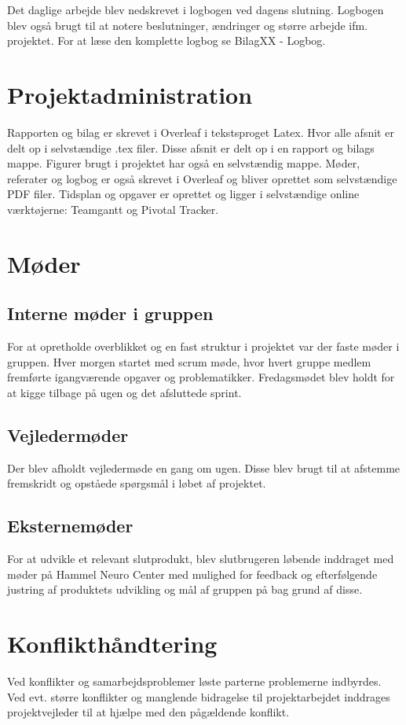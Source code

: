 Det daglige arbejde blev nedskrevet i logbogen ved dagens slutning. Logbogen blev også brugt til at notere beslutninger, ændringer og større arbejde ifm. projektet. For at læse den komplette logbog se BilagXX - Logbog.




\chapter{Projektadministration}
Rapporten og bilag er skrevet i Overleaf i tekstsproget Latex. Hvor alle afsnit er delt op i selvstændige .tex filer. Disse afsnit er delt op i en rapport og bilags mappe. Figurer brugt i projektet har også en selvstændig mappe. Møder, referater og logbog er også skrevet i Overleaf og bliver oprettet som selvstændige PDF filer. Tidsplan og opgaver er oprettet og ligger i selvstændige online værktøjerne: Teamgantt og Pivotal Tracker.    


\chapter{Møder}
\section{Interne møder i gruppen}
For at opretholde overblikket og en fast struktur i projektet var der faste møder i gruppen. Hver morgen startet med scrum møde, hvor hvert gruppe medlem fremførte igangværende opgaver og problematikker. Fredagsmødet blev holdt for at kigge tilbage på ugen og det afsluttede sprint. 

\section{Vejledermøder}
Der blev afholdt vejledermøde en gang om ugen. Disse blev brugt til at afstemme fremskridt og opståede spørgsmål i løbet af projektet.

\section{Eksternemøder}
For at udvikle et relevant slutprodukt, blev slutbrugeren løbende inddraget med møder på Hammel Neuro Center med mulighed for feedback og efterfølgende justring af produktets udvikling og mål af gruppen på bag grund af disse. 


\chapter{Konflikthåndtering}
Ved konflikter og samarbejdsproblemer løste parterne problemerne indbyrdes. Ved evt. større konflikter og manglende bidragelse til projektarbejdet inddrages projektvejleder til at hjælpe med den pågældende konflikt. 

